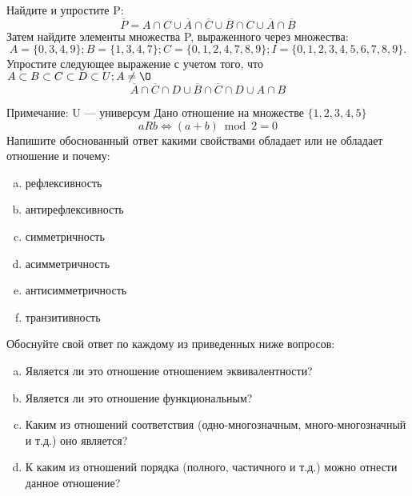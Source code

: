 \documentclass[10pt]{exam}
\begin{document}
\begin{questions}
\question
Найдите и упростите P:
\begin{equation*}
\overline{P} = A \cap C \cup \overline{A} \cap \overline{C} \cup \overline{B} \cap C \cup \overline{A} \cap \overline{B}
\end{equation*}
Затем найдите элементы множества P, выраженного через множества:
\begin{equation*}
A = \{0, 3, 4, 9\}; 
B = \{1, 3, 4, 7\};
C = \{0, 1, 2, 4, 7, 8, 9\};
I = \{0, 1, 2, 3, 4, 5, 6, 7, 8, 9\}.
\end{equation*}\question
Упростите следующее выражение с учетом того, что $A\subset B \subset C \subset D \subset U; A \neq \O$
\begin{equation*}
\overline{A} \cap \overline{C} \cap D \cup \overline{B} \cap \overline{C} \cap D \cup A \cap B
\end{equation*}

Примечание: U — универсум\question
Дано отношение на множестве $\{1, 2, 3, 4, 5\}$ 
\begin{equation*}
aRb \iff (a+b) \bmod 2 =0
\end{equation*}
Напишите обоснованный ответ какими свойствами обладает или не обладает отношение и почему:   
\begin{enumerate} [a)]\setcounter{enumi}{0}
\item рефлексивность
\item антирефлексивность
\item симметричность
\item асимметричность
\item антисимметричность
\item транзитивность
\end{enumerate}

Обоснуйте свой ответ по каждому из приведенных ниже вопросов:
\begin{enumerate} [a)]\setcounter{enumi}{0}
    \item Является ли это отношение отношением эквивалентности?
    \item Является ли это отношение функциональным?
    \item Каким из отношений соответствия (одно-многозначным, много-многозначный и т.д.) оно является?
    \item К каким из отношений порядка (полного, частичного и т.д.) можно отнести данное отношение?
\end{enumerate}




\end{questions}
\end{document}
